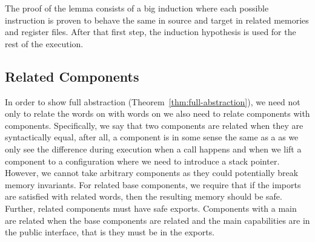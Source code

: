 \begin{jversion}
The proof of the lemma consists of a big induction where each possible instruction is proven to behave the same in source and target in related memories and register files.
After that first step, the induction hypothesis is used for the rest of the execution.

\subsection{Related Components}
\label{subsec:component-rel}
In order to show full abstraction (Theorem~\ref{thm:full-abstraction}), we need not only to relate the words on \srccm{} with words on \trgcm{} we also need to relate \srccm{} components with \trgcm{} components.
Specifically, we say that two components are related when they are syntactically equal, after all, a \srccm{} component is in some sense the same as a \trgcm{} as we only see the difference during execution when a call happens and when we lift a component to a configuration where we need to introduce a stack pointer.
However, we cannot take arbitrary components as they could potentially break memory invariants.
For related base components, we require that if the imports are satisfied with related words, then the resulting memory should be safe.
Further, related components must have safe exports.
Components with a main are related when the base components are related and the main capabilities are in the public interface, that is they must be in the exports.


\end{jversion}
